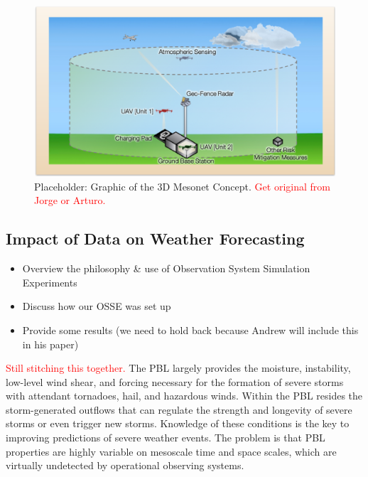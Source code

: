 \documentclass[sensors,review,submit,moreauthors,pdftex,10pt,a4paper]{mdpi}
\theoremstyle{mdpi}
\newcounter{ex}
\newcounter{re}
\theoremstyle{mdpidefinition}
\begin{document}
\begin{figure}
\centering
\includegraphics[angle=0, width=\textwidth]{figures/3DMesonetConcept.pdf}
\caption{\label{fig:3DMesonetConcept} Placeholder: Graphic of the 3D Mesonet Concept. \textcolor{red}{Get original from Jorge or Arturo.}}
\end{figure}

\subsection{Impact of Data on Weather Forecasting}
\begin{itemize}[leftmargin=*,labelsep=4mm]
\color{blue}
\item	Overview the philosophy \& use of Observation System Simulation Experiments
\item	Discuss how our OSSE was set up
\item	Provide some results (we need to hold back because Andrew will include this in his paper)
\end{itemize}

\textcolor{red}{Still stitching this together.} The PBL largely provides the moisture, instability, low-level wind shear, and forcing necessary for the formation of severe storms with attendant tornadoes, hail, and hazardous winds. Within the PBL resides the storm-generated outflows that can regulate the strength and longevity of severe storms or even trigger new storms. Knowledge of these conditions is the key to improving predictions of severe weather events. The problem is that PBL properties are highly variable on mesoscale time and space scales, which are virtually undetected by operational observing systems.
\end{document}
